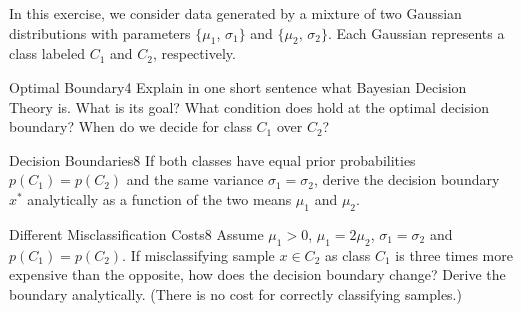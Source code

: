 \newif\ifvimbug
\vimbugfalse

\ifvimbug

\fi

In this exercise, we consider data generated by a mixture of two Gaussian distributions with parameters $\{\mu_1$, $\sigma_1\}$ and $\{\mu_2$, $\sigma_2\}$. Each Gaussian represents a class labeled $C_1$ and $C_2$, respectively. 

\begin{questions}


\begin{question}{Optimal Boundary}{4}
Explain in one short sentence what Bayesian Decision Theory is. What is its goal? 
What condition does hold at the optimal decision boundary? When do we decide for class $C_1$ over $C_2$?

\begin{answer}\end{answer}

\end{question}



\begin{question}{Decision Boundaries}{8}
If both classes have equal prior probabilities $p(C_1) = p(C_2)$ and the same variance $\sigma_1 = \sigma_2$, derive the decision boundary $x^*$ analytically as a function of the two means $\mu_1$ and $\mu_2$.

\begin{answer}\end{answer}

\end{question}


\begin{question}{Different Misclassification Costs}{8}
Assume $\mu_1 > 0$, $\mu_1 = 2\mu_2$, $\sigma_1=\sigma_2$ and $p(C_1) = p(C_2)$. If misclassifying sample $x \in C_2$ as class $C_1$ is three times more expensive than the opposite, how does the decision boundary change? Derive the boundary analytically.
(There is no cost for correctly classifying samples.)

\begin{answer}\end{answer}

\end{question}


\end{questions}
